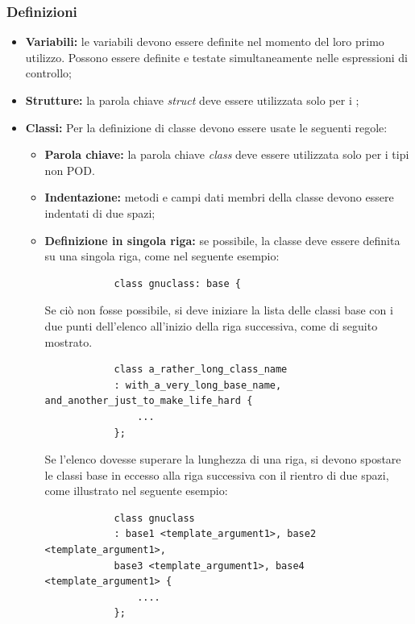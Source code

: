 \documentclass[../NomeDocumento.tex]{subfiles}
\begin{document}
	\subsubsection*{Definizioni}
	\begin{itemize}
		\item \textbf{Variabili:} le variabili devono essere definite nel momento del loro primo utilizzo. Possono essere definite e testate simultaneamente nelle espressioni di controllo;
		
		\item \textbf{Strutture:} la parola chiave \textit{struct} deve essere utilizzata solo per i ;
		
		\item \textbf{Classi:} Per la definizione di classe devono essere usate le seguenti regole:
		
		\begin{itemize}
			\item \textbf{Parola chiave:} la parola chiave \textit{class} deve essere utilizzata solo per i tipi non POD.
			\item \textbf{Indentazione:} metodi e campi dati membri della classe devono essere indentati di due spazi;
			\item \textbf{Definizione in singola riga:} se possibile, la classe deve essere definita su una singola riga, come nel seguente esempio:
			
			\begin{verbatim}
			class gnuclass: base {
			\end{verbatim}
			
			Se ciò non fosse possibile, si deve iniziare la lista delle classi base con i due punti dell'elenco all'inizio della riga successiva, come di seguito mostrato.
			
			\begin{verbatim}
			class a_rather_long_class_name
			: with_a_very_long_base_name, and_another_just_to_make_life_hard {
				...
			};
			\end{verbatim}
			
			Se l'elenco dovesse superare la lunghezza di una riga, si devono spostare le classi base in eccesso alla riga successiva con il rientro di due spazi, come illustrato nel seguente esempio:
			
			\begin{verbatim}
			class gnuclass
			: base1 <template_argument1>, base2 <template_argument1>,
			base3 <template_argument1>, base4 <template_argument1> {
				....
			};
			\end{verbatim}
		

\end{itemize}
\end{itemize}
\end{document}
